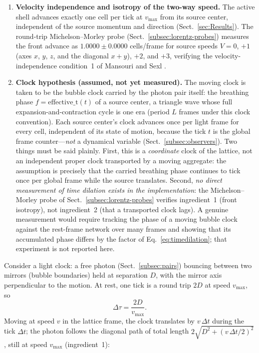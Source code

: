 \documentclass{ijuc}
\begin{document}
\begin{enumerate}
\item \textbf{Velocity independence and isotropy of the two-way speed.}  The active shell advances exactly one cell per tick at $v_{\max}$ from its source center, independent of the source momentum and direction (Sect.~\ref{sec:Results}).  The round-trip Michelson--Morley probe (Sect.~\ref{subsec:lorentz-probes}) measures the front advance as $1.0000\pm0.0000$ cells/frame for source speeds $V=0$, $+1$ (axes $x$, $y$, $z$, and the diagonal $x{+}y$), $+2$, and $+3$, verifying the velocity-independence condition~1 of Mansouri and Sexl \cite{mansouri-sexl}.
\item \textbf{Clock hypothesis (assumed, not yet measured).}  The moving clock is taken to be the bubble clock carried by the photon pair itself: the breathing phase $f=\mathrm{effective\_t}(t)$ of a source center, a triangle wave whose full expansion-and-contraction cycle is one era (period $L$ frames under this clock convention).  Each source center's clock advances once per light frame for every cell, independent of its state of motion, because the tick $t$ is the global frame counter---\emph{not} a dynamical variable (Sect.~\ref{subsec:observers}).  Two things must be said plainly.  First, this is a \emph{coordinate} clock of the lattice, not an independent proper clock transported by a moving aggregate: the assumption is precisely that the carried breathing phase continues to tick once per global frame while the source translates.  Second, \emph{no direct measurement of time dilation exists in the implementation}: the Michelson--Morley probe of Sect.~\ref{subsec:lorentz-probes} verifies ingredient~1 (front isotropy), not ingredient~2 (that a transported clock lags).  A genuine measurement would require tracking the phase of a moving bubble clock against the rest-frame network over many frames and showing that its accumulated phase differs by the factor of Eq.~\eqref{eq:timedilation}; that experiment is not reported here.
\end{enumerate}
Consider a light clock: a free photon (Sect.~\ref{subsec:pairs}) bouncing between two mirrors (bubble boundaries) held at separation $D$, with the mirror axis perpendicular to the motion.  At rest, one tick is a round trip $2D$ at speed $v_{\max}$, so
\begin{equation}
\Delta\tau = \frac{2D}{v_{\max}} .
\label{eq:tick-rest}
\end{equation}
Moving at speed $v$ in the lattice frame, the clock translates by $v\,\Delta t$ during the tick $\Delta t$; the photon follows the diagonal path of total length $2\sqrt{D^{2}+(v\,\Delta t/2)^{2}}$, still at speed $v_{\max}$ (ingredient~1):
\end{document}
